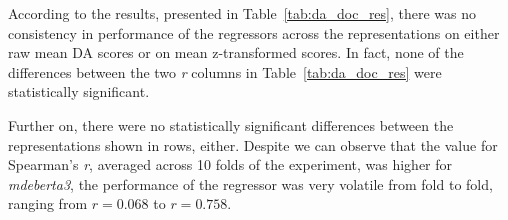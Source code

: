 According to the results, presented in Table~\ref{tab:da_doc_res}, there was no consistency in performance of the regressors across the representations on either raw mean DA scores or on mean z-transformed scores. In fact, none of the differences between the two \textit{r} columns in Table~\ref{tab:da_doc_res} were statistically significant.

Further on, there were no statistically significant differences between the representations shown in rows, either. Despite we can observe that the value for Spearman's \textit{r}, averaged across 10 folds of the experiment, was higher for \textit{mdeberta3}, the performance of the regressor was very volatile from fold to fold, ranging from $r=0.068$ to $r=0.758$.  

